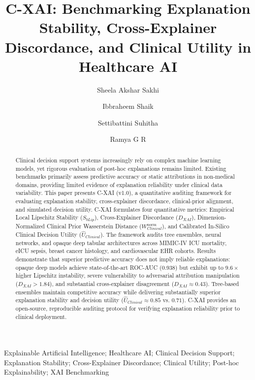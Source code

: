 \documentclass[3p,times,procedia]{elsarticle}
\theoremstyle{definition}
\begin{document}
\setlength{\bibsep}{0.8pt}
\begin{frontmatter}

\title{C-XAI: Benchmarking Explanation Stability, Cross-Explainer Discordance, and Clinical Utility in Healthcare AI}

\author[a]{Sheela Akshar Sakhi} 
\author[a]{Ibbraheem Shaik}
\author[a]{Settibattini Suhitha}
\author[b]{Ramya G R}

\address[a]{Department of Computer Science and Engineering, Amrita School of Computing, Coimbatore. Amrita Vishwa Vidyapeetham, India.}
\address[b]{Department of Computer Science and Engineering, Amrita School of Computing, Coimbatore. Amrita Vishwa Vidyapeetham, India.}

\begin{abstract}
Clinical decision support systems increasingly rely on complex machine learning models, yet rigorous evaluation of post-hoc explanations remains limited. Existing benchmarks primarily assess predictive accuracy or static attributions in non-medical domains, providing limited evidence of explanation reliability under clinical data variability. This paper presents C-XAI (v1.0), a quantitative auditing framework for evaluating explanation stability, cross-explainer discordance, clinical-prior alignment, and simulated decision utility. C-XAI formulates four quantitative metrics: Empirical Local Lipschitz Stability ($S_{bLip}$), Cross-Explainer Discordance ($D_{XAI}$), Dimension-Normalized Clinical Prior Wasserstein Distance ($W_{Clinical}^{\mathrm{norm}}$), and Calibrated In-Silico Clinical Decision Utility ($\widehat{U}_{Clinical}$). The framework audits tree ensembles, neural networks, and opaque deep tabular architectures across MIMIC-IV ICU mortality, eICU sepsis, breast cancer histology, and cardiovascular EHR cohorts. Results demonstrate that superior predictive accuracy does not imply reliable explanations: opaque deep models achieve state-of-the-art ROC-AUC (0.938) but exhibit up to $9.6\times$ higher Lipschitz instability, severe vulnerability to adversarial attribution manipulation ($D_{XAI} > 1.84$), and substantial cross-explainer disagreement ($D_{XAI} \approx 0.43$). Tree-based ensembles maintain competitive accuracy while delivering substantially superior explanation stability and decision utility ($\widehat{U}_{Clinical} \approx 0.85$ vs. $0.71$). C-XAI provides an open-source, reproducible auditing protocol for verifying explanation reliability prior to clinical deployment.
\end{abstract}

\begin{keyword}
Explainable Artificial Intelligence; Healthcare AI; Clinical Decision Support; Explanation Stability; Cross-Explainer Discordance; Clinical Utility; Post-hoc Explainability; XAI Benchmarking
\end{keyword}

\end{frontmatter}
\vspace*{-4pt}
\end{document}
